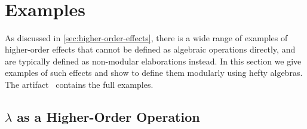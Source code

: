 \begin{code}[hide]
\AgdaSpace{}%
\AgdaSpace{}%
\AgdaSymbol{(}\AgdaSymbol{;}\AgdaSpace{}%
\AgdaInductiveConstructor{[]}\AgdaSymbol{;}\AgdaSpace{}%
\AgdaSymbol{;}\AgdaSpace{}%
\AgdaOperator{\AgdaFunction{\AgdaUnderscore{}++\AgdaUnderscore{}}}\AgdaSymbol{;}\AgdaSpace{}%
\AgdaSymbol{)}\<%
\\
\>[0]\AgdaSpace{}%
\AgdaSpace{}%
\<%
\\
\>[0]\AgdaSpace{}%
\AgdaSpace{}%
\AgdaSpace{}%
\AgdaSpace{}%
\AgdaSymbol{(}\AgdaSymbol{)}\<%
\\
\>[0]\AgdaSpace{}%
\AgdaSpace{}%
\AgdaSpace{}%
\AgdaSpace{}%
\AgdaSymbol{(}\AgdaOperator{\AgdaInductiveConstructor{[\AgdaUnderscore{}]}}\AgdaSymbol{)}\<%
\\
\>[0]\<%
\end{code}

\section{Examples}
\label{sec:examples}

As discussed in \cref{sec:higher-order-effects}, there is a wide range of examples of higher-order effects that cannot be defined as algebraic operations directly, and are typically defined as non-modular elaborations instead.
In this section we give examples of such effects and show to define them modularly using hefty algebras.
The artifact~\cite{artifact} contains the full examples.


\subsection{$\lambda$ as a Higher-Order Operation}
\label{sec:higher-order-lambda}

